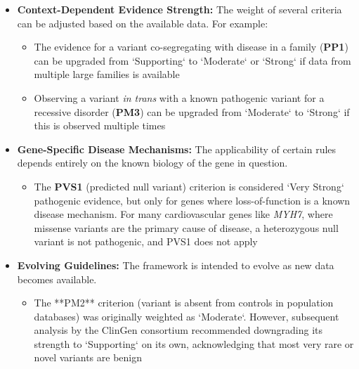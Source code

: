 \documentclass[../main.tex]{subfiles}
\begin{document}
\begin{itemize}[leftmargin=*, itemsep=2pt]
    \item \textbf{Context-Dependent Evidence Strength:} The weight of several criteria can be adjusted based on the available data. For example:
    \begin{itemize}
        \item The evidence for a variant co-segregating with disease in a family (\textbf{PP1}) can be upgraded from `Supporting` to `Moderate` or `Strong` if data from multiple large families is available
        \item Observing a variant \textit{in trans} with a known pathogenic variant for a recessive disorder (\textbf{PM3}) can be upgraded from `Moderate` to `Strong` if this is observed multiple times
    \end{itemize}

    \item \textbf{Gene-Specific Disease Mechanisms:} The applicability of certain rules depends entirely on the known biology of the gene in question.
    \begin{itemize}
        \item The \textbf{PVS1} (predicted null variant) criterion is considered `Very Strong` pathogenic evidence, but only for genes where loss-of-function is a known disease mechanism. For many cardiovascular genes like \textit{MYH7}, where missense variants are the primary cause of disease, a heterozygous null variant is not pathogenic, and PVS1 does not apply
    \end{itemize}
    
    \item \textbf{Evolving Guidelines:} The framework is intended to evolve as new data becomes available.
    \begin{itemize}
        \item The **PM2** criterion (variant is absent from controls in population databases) was originally weighted as `Moderate`. However, subsequent analysis by the ClinGen consortium recommended downgrading its strength to `Supporting` on its own, acknowledging that most very rare or novel variants are benign 
    \end{itemize}
\end{itemize}
\end{document}
